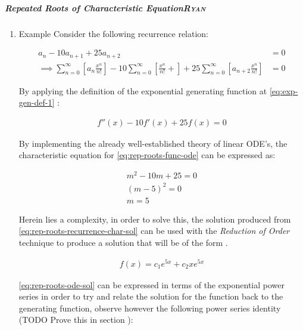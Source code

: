 \documentclass[11pt]{article}
\begin{document}
\subparagraph{Repeated Roots of Characteristic Equation\hfill{}\textsc{Ryan}}
\label{rep-roots-recurrence}
\begin{enumerate}
\item Example
\label{sec:orgbb05453}
Consider the following recurrence relation:

\begin{align}
    a_n -  10a_{n+ 1} +  25a_{n+  2}&= 0 \label{eq:hom-repeated-roots-recurrence} \\
    \implies  \sum^{\infty}_{n= 0}   {\left[{ a_n \frac{x^n}{n!} }\right]} - 10 \sum^{\infty}_{n= 0}   {\left[{ \frac{x^n}{n!}+    }\right]} + 25 \sum^{\infty}_{n= 0 }   {\left[{  a_{n+  2 }\frac{x^n}{n!} }\right]}&= 0 \nonumber
\end{align}

By applying the definition of the exponential generating function at \eqref{eq:exp-gen-def-1} :

\begin{align}
    f''{\left({ x }\right)}- 10f'{\left({ x }\right)}+  25f{\left({ x }\right)}= 0 \nonumber \label{eq:rep-roots-func-ode}
\end{align}

By implementing the already well-established theory of linear ODE's, the
characteristic equation for \eqref{eq:rep-roots-func-ode} can be expressed as:

\begin{align}
    m^2- 10m+  25 = 0 \nonumber \\
    {\left({ m- 5 }\right)}^2 = 0 \nonumber \\
    m= 5 \label{eq:rep-roots-recurrence-char-sol}
\end{align}

Herein lies a complexity, in order to solve this, the solution produced from \eqref{eq:rep-roots-recurrence-char-sol} can be used with the \emph{Reduction of Order} technique to produce a solution that will be of the form \cite[]{zillMatrixExponential2009}.

\begin{align}
    f{\left({ x }\right)}= c_1e^{5x} +  c_2 x e^{5x} \label{eq:rep-roots-ode-sol}
\end{align}

\eqref{eq:rep-roots-ode-sol} can be expressed in terms of the exponential power series in order to try and relate the solution for the function back to the generating function,
observe however the following power series identity (TODO Prove this in section ):


\end{enumerate}
\end{document}
